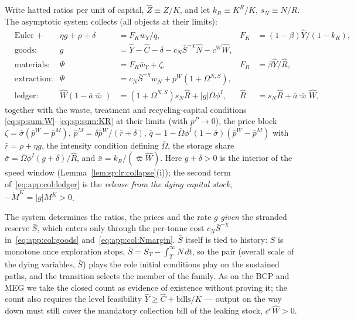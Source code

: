  Write hatted ratios per unit of capital,
$\hat Z\equiv Z/K$, and let $k_R\equiv K^R/K$, $s_N\equiv N/R$. The asymptotic system
collects (all objects at their limits):
\begin{align}
&\text{Euler + capital:}
&
\eta g+\rho+\delta&=F_K\bar w_Y/\bar q,
&
F_K&=\left(1-\beta\right)\hat Y/\left(1-k_R\right),
\label{eq:app:col:euler}
\\
&\text{goods:}
&
g&=\hat Y-\hat C-\delta-c_N\bar S^{-\chi}\hat N-c^W\hat W,
\label{eq:app:col:goods}
\\
&\text{materials:}
&
\Psi&=F_R\bar w_Y+\zeta,
&
F_R&=\beta\hat Y/\hat R,
\label{eq:app:col:psi}
\\
&\text{extraction:}
&
\Psi&=c_N\bar S^{-\chi}\bar w_N+\bar p^W\!\left(1+\Omega^{N,S}\right),
\label{eq:app:col:Nmargin}
\\
&\text{ledger:}
&
\hat W\left(1-\bar a\bar\varpi\right)&=\left(1+\Omega^{N,S}\right)s_N\hat R
+\left|g\right|\bar\Omega\phi^I,
&
\hat R&=s_N\hat R+\bar a\bar\varpi\hat W,
\label{eq:app:col:ledger}
\end{align}
together with the waste, treatment and recycling-capital conditions
\eqref{eq:sp:sum:W}--\eqref{eq:sp:sum:KR} at their limits (with $p^P\to0$), the price block
$\zeta=\bar\sigma\left(\bar p^W-\bar p^M\right)$,
$\bar p^M=\delta\bar p^W\!/\left(\bar r+\delta\right)$,
$\bar q=1-\bar\Omega\phi^I\left(1-\bar\sigma\right)\left(\bar p^W-\bar p^M\right)$ with
$\bar r=\rho+\eta g$, the intensity condition defining $\bar\Omega$, the storage share
$\bar\sigma=\bar\Omega\phi^I\left(g+\delta\right)/\hat R$, and $\bar x=k_R/\left(\bar\varpi\hat W\right)$.
Here $g+\delta>0$ is the interior of the speed window
(Lemma~\ref{lem:sp:lr:collapse}(i)); the second term of~\eqref{eq:app:col:ledger} is the
\emph{release from the dying capital stock}, $-\dot M^K=\left|g\right|M^K>0$.

 The system determines the ratios, the prices and
the rate $g$ \emph{given} the stranded reserve $\bar S$, which enters only through the
per-tonne cost $c_N\bar S^{-\chi}$ in~\eqref{eq:app:col:goods}
and~\eqref{eq:app:col:Nmargin}. $\bar S$ itself is tied to history: $S$ is monotone once
exploration stops, $\bar S=S_{T}-\int_T^\infty N\,dt$, so the pair (overall scale of the
dying variables, $\bar S$) plays the role initial conditions play on the sustained paths, and
the transition selects the member of the family. As on the BCP and MEG we take the closed
count as evidence of existence without proving it; the count also requires the level
feasibility $\hat Y\ge\hat C+\text{bills}/K$ --- output on the way down must still cover the
mandatory collection bill of the leaking stock, $c^c\hat W>0$.

